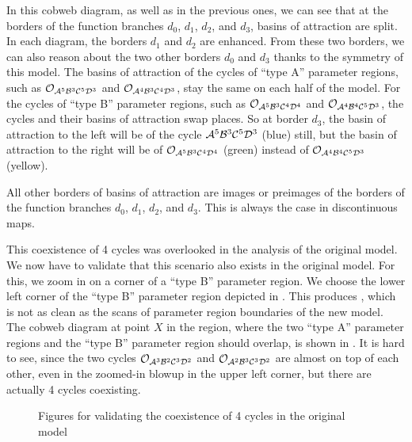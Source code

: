 In this cobweb diagram, as well as in the previous ones, we can see that at the borders of the function branches $d_0$, $d_1$, $d_2$, and $d_3$, basins of attraction are split.
In each diagram, the borders $d_1$ and $d_2$ are enhanced.
From these two borders, we can also reason about the two other borders $d_0$ and $d_3$ thanks to the symmetry of this model.
The basins of attraction of the cycles of ``type A'' parameter regions, such as $\mathcal{O}_{\mathcal{A}^5\mathcal{B}^3\mathcal{C}^5\mathcal{D}^3}$ and $\mathcal{O}_{\mathcal{A}^4\mathcal{B}^3\mathcal{C}^4\mathcal{D}^3}$, stay the same on each half of the model.
For the cycles of ``type B'' parameter regions, such as $\mathcal{O}_{\mathcal{A}^5\mathcal{B}^3\mathcal{C}^4\mathcal{D}^4}$ and $\mathcal{O}_{\mathcal{A}^4\mathcal{B}^4\mathcal{C}^5\mathcal{D}^3}$, the cycles and their basins of attraction swap places.
So at border $d_3$, the basin of attraction to the left will be of the cycle $\mathcal{A}^5\mathcal{B}^3\mathcal{C}^5\mathcal{D}^3$ (blue) still, but the basin of attraction to the right will be of $\mathcal{O}_{\mathcal{A}^5\mathcal{B}^3\mathcal{C}^4\mathcal{D}^4}$ (green) instead of $\mathcal{O}_{\mathcal{A}^4\mathcal{B}^4\mathcal{C}^5\mathcal{D}^3}$ (yellow).

All other borders of basins of attraction are images or preimages of the borders of the function branches $d_0$, $d_1$, $d_2$, and $d_3$.
This is always the case in discontinuous maps. 

This coexistence of 4 cycles was overlooked in the analysis of the original model.
We now have to validate that this scenario also exists in the original model.
For this, we zoom in on a corner of a ``type B'' parameter region.
We choose the lower left corner of the ``type B'' parameter region depicted in .
This produces , which is not as clean as the scans of parameter region boundaries of the new model.
The cobweb diagram at point $X$ in the region, where the two ``type A'' parameter regions and the ``type B'' parameter region should overlap, is shown in .
It is hard to see, since the two cycles $\mathcal{O}_{\mathcal{A}^3\mathcal{B}^2\mathcal{C}^3\mathcal{D}^2}$ and $\mathcal{O}_{\mathcal{A}^2\mathcal{B}^3\mathcal{C}^3\mathcal{D}^2}$ are almost on top of each other, even in the zoomed-in blowup in the upper left corner, but there are actually 4 cycles coexisting.

\begin{figure}
	\centering
	\caption{Figures for validating the coexistence of 4 cycles in the original model}
\end{figure}
